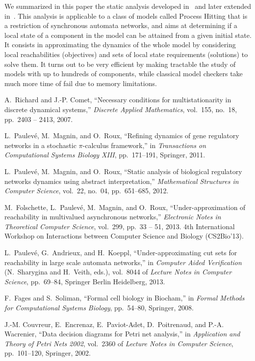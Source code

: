 \documentclass{movep}
\newcounter{la}
\begin{document}
We summarized in this paper the static analysis developed in~\cite{PMR12-MSCS}
and later extended in~\cite{FPMR13-CS2Bio}.
This analysis is applicable to a class of models called Process Hitting that is a
restriction of synchronous automata networks,
and aims at determining if a local state of a component in the model can be attained from a given
initial state.
It consists in approximating the dynamics of the whole model by considering local
reachabilities (objectives)
and sets of local state requirements (solutions) to solve them.
It turns out to be very efficient by making tractable the study of models
with up to hundreds of components,
while classical model checkers take much more time of fail due to memory limitations.



%
%

\begin{thebibliography}{1}

A.~Richard and J.-P. Comet, ``Necessary conditions for multistationarity in
  discrete dynamical systems,'' {\em Discrete Applied Mathematics}, vol.~155,
  no.~18, pp.~2403 -- 2413, 2007.

L.~{P}aulev{\'e}, M.~{M}agnin, and O.~{R}oux, ``Refining dynamics of gene
  regulatory networks in a stochastic $\pi$-calculus framework,'' in {\em
  Transactions on Computational Systems Biology XIII}, pp.~171--191, Springer,
  2011.

L.~Paulev\'{e}, M.~Magnin, and O.~Roux, ``Static analysis of biological
  regulatory networks dynamics using abstract interpretation,'' {\em
  Mathematical Structures in Computer Science}, vol.~22, no.~04, pp.~651--685,
  2012.

M.~Folschette, L.~Paulev{\'e}, M.~Magnin, and O.~Roux, ``Under-approximation of
  reachability in multivalued asynchronous networks,'' {\em Electronic Notes in
  Theoretical Computer Science}, vol.~299, pp.~33 -- 51, 2013.
\newblock 4th International Workshop on Interactions between Computer Science
  and Biology (CS2Bio'13).

L.~Paulev{\'e}, G.~Andrieux, and H.~Koeppl, ``Under-approximating cut sets for
  reachability in large scale automata networks,'' in {\em Computer Aided
  Verification} (N.~Sharygina and H.~Veith, eds.), vol.~8044 of {\em Lecture
  Notes in Computer Science}, pp.~69--84, Springer Berlin Heidelberg, 2013.

F.~Fages and S.~Soliman, ``Formal cell biology in {B}iocham,'' in {\em Formal
  Methods for Computational Systems Biology}, pp.~54--80, Springer, 2008.

J.-M. Couvreur, E.~Encrenaz, E.~Paviot-Adet, D.~Poitrenaud, and P.-A.
  Wacrenier, ``Data decision diagrams for {P}etri net analysis,'' in {\em
  Application and Theory of Petri Nets 2002}, vol.~2360 of {\em Lecture Notes
  in Computer Science}, pp.~101--120, Springer, 2002.

\end{thebibliography}
\end{document}
